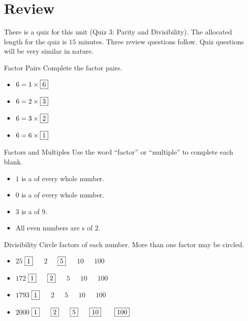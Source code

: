 \documentclass[a4paper,10pt]{report}
\begin{document}
\section{Review}

There is a quiz for this unit (Quiz 3: Parity and Divisibility). The allocated
length for the quiz is $15$ minutes. Three review questions follow. Quiz
questions will be very similar in nature.

\begin{problem}{Factor Pairs}
 Complete the factor pairs.

 \begin{itemize}
  \item $6 = 1 \times \Ans{6}$
  \item $6 = 2 \times \Ans{3}$
  \item $6 = 3 \times \Ans{2}$
  \item $6 = 6 \times \Ans{1}$
 \end{itemize}
\end{problem}

\begin{problem}{Factors and Multiples}
 Use the word ``factor'' or ``multiple'' to complete each blank.

 \begin{itemize}
  \item $1$ is a  of every whole number.
  \item $0$ is a  of every whole number.
  \item $3$ is a  of $9$.
  \item All even numbers are s of $2$.
 \end{itemize}
\end{problem}

\begin{problem}{Divisibility}
 Circle factors of each number. More than one factor may be circled.

 \begin{itemize}
  \item $25$ \hfill $\Ans{1}$~~~$2$~~~$\Ans{5}$~~~$10$~~~$100$
  \item $172$ \hfill $\Ans{1}$~~~$\Ans{2}$~~~$5$~~~$10$~~~$100$
  \item $1793$ \hfill $\Ans{1}$~~~$2$~~~$5$~~~$10$~~~$100$
  \item $2000$ \hfill $\Ans{1}$~~~$\Ans{2}$~~~$\Ans{5}$~~~$\Ans{10}$
  ~~~$\Ans{100}$
 \end{itemize}
\end{problem}
\end{document}
